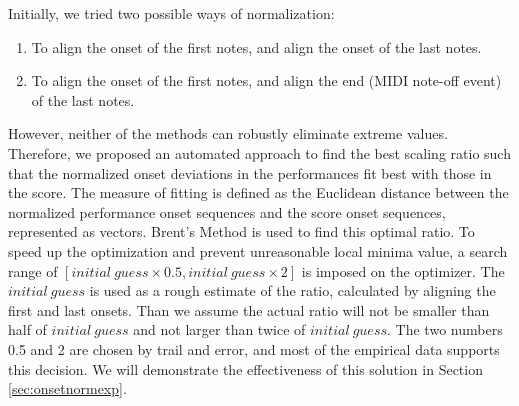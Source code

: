
   Initially, we tried two possible ways of normalization: 
   \begin{enumerate}
      \item To align the onset of the first notes, and align the onset of the last notes.
      \item To align the onset of the first notes, and align the end (MIDI note-off event) of the last notes.
   \end{enumerate}
   However, neither of the methods can robustly eliminate extreme values.  Therefore, we proposed an automated approach to find the best scaling ratio such that the normalized onset deviations in the performances fit best with those in the score. The measure of fitting is defined as the Euclidean distance between the normalized performance onset sequences and the score onset sequences, represented as vectors. %
 Brent's Method \cite{brent1973} is used to find this optimal ratio. To speed up the optimization and prevent unreasonable local minima value, a search range of $[initial\ guess \times 0.5 , initial\ guess \times 2]$ is imposed on the optimizer. The $initial\ guess$ is used as a rough estimate of the ratio, calculated by aligning the first and last onsets. Than we assume the actual ratio will not be smaller than half of $initial\ guess$ and not larger than twice of $initial\ guess$. The two numbers 0.5 and 2 are chosen by trail and error, and most of the empirical data supports this decision. We will demonstrate the effectiveness of this solution in Section \ref{sec:onsetnormexp}.

